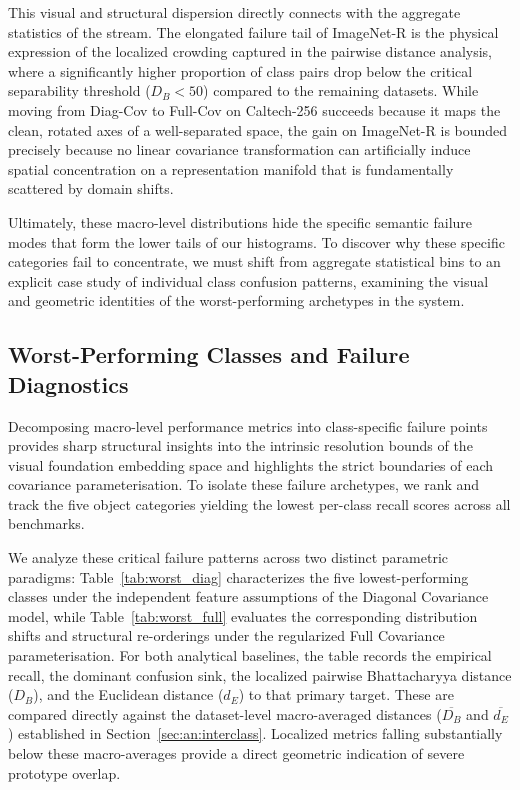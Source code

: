 This visual and structural dispersion directly connects with the aggregate statistics of the stream. The elongated failure tail of ImageNet-R is the physical expression of the localized crowding captured in the pairwise distance analysis, where a significantly higher proportion of class pairs drop below the critical separability threshold ($D_B < 50$) compared to the remaining datasets. While moving from Diag-Cov to Full-Cov on Caltech-256 succeeds because it maps the clean, rotated axes of a well-separated space, the gain on ImageNet-R is bounded precisely because no linear covariance transformation can artificially induce spatial concentration on a representation manifold that is fundamentally scattered by domain shifts.

Ultimately, these macro-level distributions hide the specific semantic failure modes that form the lower tails of our histograms. To discover why these specific categories fail to concentrate, we must shift from aggregate statistical bins to an explicit case study of individual class confusion patterns, examining the visual and geometric identities of the worst-performing archetypes in the system.

\subsection{Worst-Performing Classes and Failure Diagnostics}
\label{sec:worst_classes}

Decomposing macro-level performance metrics into class-specific failure points provides sharp structural insights into the intrinsic resolution bounds of the visual foundation embedding space and highlights the strict boundaries of each covariance parameterisation. To isolate these failure archetypes, we rank and track the five object categories yielding the lowest per-class recall scores across all benchmarks. 

We analyze these critical failure patterns across two distinct parametric paradigms: Table~\ref{tab:worst_diag} characterizes the five lowest-performing classes under the independent feature assumptions of the Diagonal Covariance model, while Table~\ref{tab:worst_full} evaluates the corresponding distribution shifts and structural re-orderings under the regularized Full Covariance parameterisation. For both analytical baselines, the table records the empirical recall, the dominant confusion sink, the localized pairwise Bhattacharyya distance ($D_B$), and the Euclidean distance ($d_E$) to that primary target. These are compared directly against the dataset-level macro-averaged distances ($\overline{D_B}$ and $\overline{d_E}$) established in Section~\ref{sec:an:interclass}. Localized metrics falling substantially below these macro-averages provide a direct geometric indication of severe prototype overlap.

